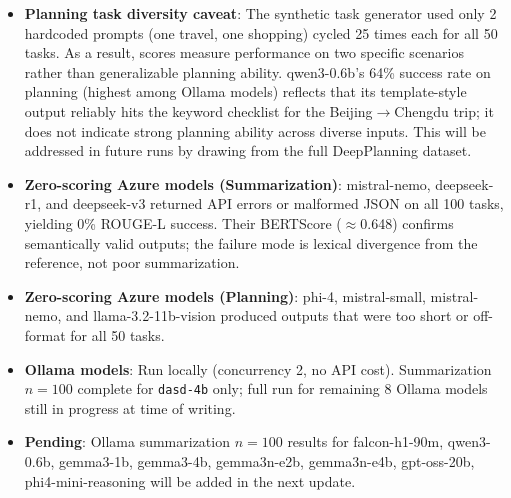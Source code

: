 \documentclass[11pt,letterpaper]{article}
\begin{document}
\begin{itemize}
\item \textbf{Planning task diversity caveat}: The synthetic task generator used only 2 hardcoded prompts (one travel, one shopping) cycled 25 times each for all 50 tasks. As a result, scores measure performance on two specific scenarios rather than generalizable planning ability. qwen3-0.6b's 64\% success rate on planning (highest among Ollama models) reflects that its template-style output reliably hits the keyword checklist for the Beijing$\to$Chengdu trip; it does not indicate strong planning ability across diverse inputs. This will be addressed in future runs by drawing from the full DeepPlanning dataset.

\item \textbf{Zero-scoring Azure models (Summarization)}: mistral-nemo, deepseek-r1, and deepseek-v3 returned API errors or malformed JSON on all 100 tasks, yielding 0\% ROUGE-L success. Their BERTScore ($\approx$0.648) confirms semantically valid outputs; the failure mode is lexical divergence from the reference, not poor summarization.

\item \textbf{Zero-scoring Azure models (Planning)}: phi-4, mistral-small, mistral-nemo, and llama-3.2-11b-vision produced outputs that were too short or off-format for all 50 tasks.

\item \textbf{Ollama models}: Run locally (concurrency 2, no API cost). Summarization $n=100$ complete for \texttt{dasd-4b} only; full run for remaining 8 Ollama models still in progress at time of writing.

\item \textbf{Pending}: Ollama summarization $n=100$ results for falcon-h1-90m, qwen3-0.6b, gemma3-1b, gemma3-4b, gemma3n-e2b, gemma3n-e4b, gpt-oss-20b, phi4-mini-reasoning will be added in the next update.
\end{itemize}
\end{document}
